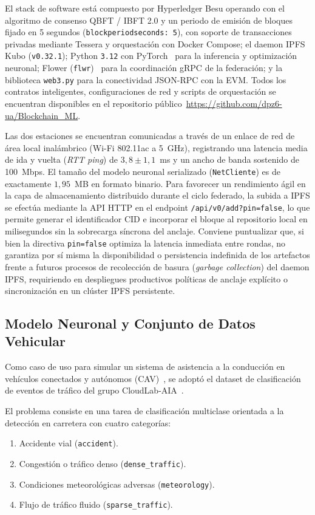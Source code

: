 El stack de software está compuesto por Hyperledger Besu operando con el algoritmo de consenso QBFT / IBFT 2.0 y un periodo de emisión de bloques fijado en 5 segundos (\texttt{blockperiodseconds: 5}), con soporte de transacciones privadas mediante Tessera y orquestación con Docker Compose; el daemon IPFS Kubo (\texttt{v0.32.1}); Python \texttt{3.12} con PyTorch~\cite{paszke2019pytorch} para la inferencia y optimización neuronal; Flower (\texttt{flwr})~\cite{beutel2020flower} para la coordinación gRPC de la federación; y la biblioteca \texttt{web3.py} para la conectividad JSON-RPC con la EVM. Todos los contratos inteligentes, configuraciones de red y scripts de orquestación se encuentran disponibles en el repositorio público~\url{https://github.com/dpz6-ua/Blockchain_ML}.

Las dos estaciones se encuentran comunicadas a través de un enlace de red de área local inalámbrico (Wi-Fi 802.11ac a 5~GHz), registrando una latencia media de ida y vuelta (\textit{RTT ping}) de $3{,}8 \pm 1{,}1$~ms y un ancho de banda sostenido de 100~Mbps. El tamaño del modelo neuronal serializado (\texttt{NetCliente}) es de exactamente $1{,}95$~MB en formato binario. Para favorecer un rendimiento ágil en la capa de almacenamiento distribuido durante el ciclo federado, la subida a IPFS se efectúa mediante la API HTTP en el endpoint \texttt{/api/v0/add?pin=false}, lo que permite generar el identificador CID e incorporar el bloque al repositorio local en milisegundos sin la sobrecarga síncrona del anclaje. Conviene puntualizar que, si bien la directiva \texttt{pin=false} optimiza la latencia inmediata entre rondas, no garantiza por sí misma la disponibilidad o persistencia indefinida de los artefactos frente a futuros procesos de recolección de basura (\textit{garbage collection}) del daemon IPFS, requiriendo en despliegues productivos políticas de anclaje explícito o sincronización en un clúster IPFS persistente.

\subsection{Modelo Neuronal y Conjunto de Datos Vehicular}
Como caso de uso para simular un sistema de asistencia a la conducción en vehículos conectados y autónomos (CAV)~\cite{chellapandi2024federated}, se adoptó el dataset de clasificación de eventos de tráfico del grupo CloudLab-AIA~\cite{cloudlabaia_flblockchain}. 

El problema consiste en una tarea de clasificación multiclase orientada a la detección en carretera con cuatro categorías:
\begin{enumerate}
    \item Accidente vial (\texttt{accident}).
    \item Congestión o tráfico denso (\texttt{dense\_traffic}).
    \item Condiciones meteorológicas adversas (\texttt{meteorology}).
    \item Flujo de tráfico fluido (\texttt{sparse\_traffic}).
\end{enumerate}

